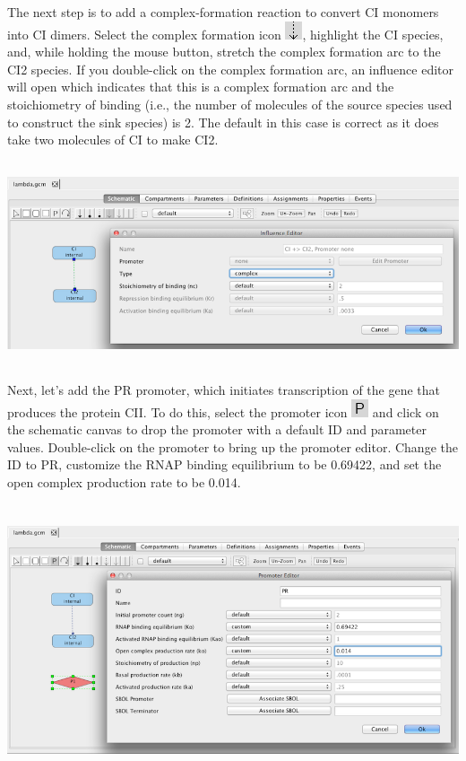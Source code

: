 \documentclass[titlepage,11pt]{article}
\begin{document}
The next step is to add a complex-formation reaction to convert CI monomers into CI dimers.  Select the complex formation icon \includegraphics{../gui/icons/modelview/bio_activation_selected}, highlight the CI species, and, while holding the mouse button, stretch the complex formation arc to the CI2 species.  If you double-click on the complex formation arc, an influence editor will open which indicates that this is a complex formation arc and the stoichiometry of binding (i.e., the number of molecules of the source species used to construct the sink species) is 2.  The default in this case is correct as it does take two molecules of CI to make CI2.

\begin{center}
\includegraphics[height=60mm]{screenshots/complex} 
\end{center}

Next, let's add the PR promoter, which initiates transcription of the gene that produces the protein CII.  To do this, select the promoter icon \includegraphics{../gui/icons/modelview/promoter_mode_selected} and click on the schematic canvas to drop the promoter with a default ID and parameter values.  Double-click on the promoter to bring up the promoter editor.  Change the ID to PR, customize the RNAP binding equilibrium to be 0.69422, and set the open complex production rate to be 0.014. 

\begin{center}
\includegraphics[height=80mm]{screenshots/promoter} 
\end{center}
\end{document}
